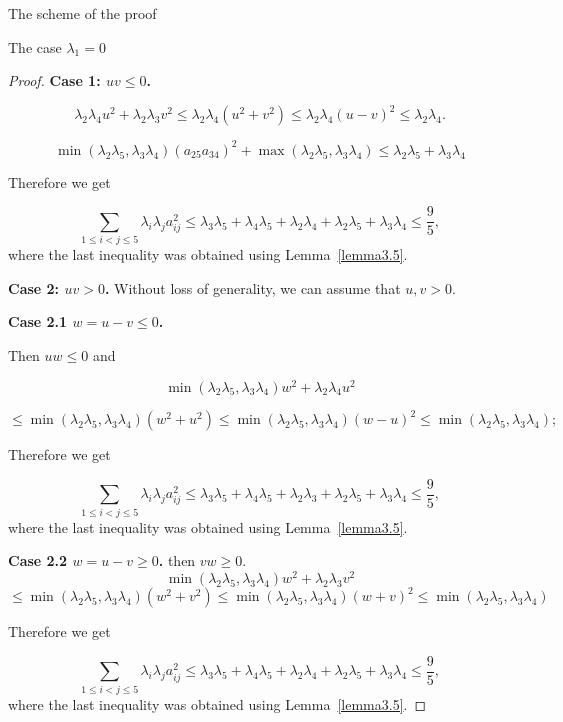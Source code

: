 \documentclass[12pt]{article}
\begin{document}
\begin{section}{The scheme of the proof}
\begin{section}{The case  \texorpdfstring{$\lambda_{1} = 0$}{Lg}}
\begin{proof}
    \textbf{Case 1: $uv\leq 0$.} 

    $$
        \lambda_{2}\lambda_{4}u^{2} + \lambda_{2}\lambda_{3}v^{2} \leq   \lambda_{2}\lambda_{4}(u^{2} + v^{2}) \leq \lambda_{2}\lambda_{4}(u - v)^{2} \leq \lambda_{2}\lambda_{4}.
    $$

    $$
     \min(\lambda_{2}\lambda_{5},\lambda_{3}\lambda_{4} )(a_{25}a_{34})^{2} + \max(\lambda_{2}\lambda_{5},\lambda_{3}\lambda_{4} ) \leq \lambda_{2}\lambda_{5} + \lambda_{3}\lambda_{4}
    $$

    Therefore we get
    
    $$
        \sum_{1\leq i < j\leq 5}\lambda_{i}\lambda_{j} a_{ij}^{2} \leq \lambda_{3}\lambda_{5} + \lambda_{4}\lambda_{5} + \lambda_{2}\lambda_{4} + \lambda_{2}\lambda_{5} + \lambda_{3}\lambda_{4}\leq \frac{9}{5},
    $$
    where the last inequality was obtained using Lemma~\ref{lemma3.5}. 
    
    \textbf{Case 2: $uv > 0$.}
    Without loss of generality, we can assume that 
    $u,v>0$.
    
    \textbf{Case 2.1 $w = u-v \leq 0$.}
    
    Then $ uw\leq 0$ and  

    $$
        \min(\lambda_{2}\lambda_{5},\lambda_{3}\lambda_{4} )w^{2} + \lambda_{2}\lambda_{4}u^{2}
        $$
        
        $$
        \leq \min(\lambda_{2}\lambda_{5},\lambda_{3}\lambda_{4} )(w^{2} + u^{2}) \leq \min(\lambda_{2}\lambda_{5},\lambda_{3}\lambda_{4} )(w - u)^{2} \leq \min(\lambda_{2}\lambda_{5},\lambda_{3}\lambda_{4} );
    $$

     Therefore we get
    
    $$
        \sum_{1\leq i < j\leq 5}\lambda_{i}\lambda_{j} a_{ij}^{2} \leq \lambda_{3}\lambda_{5} + \lambda_{4}\lambda_{5} + \lambda_{2}\lambda_{3} + \lambda_{2}\lambda_{5} + \lambda_{3}\lambda_{4}\leq \frac{9}{5},
    $$
    where the last inequality was obtained using Lemma~\ref{lemma3.5}.

    \textbf{Case  2.2 $w = u-v \geq 0$.} then $vw\geq 0.$
    $$
        \min(\lambda_{2}\lambda_{5},\lambda_{3}\lambda_{4} )w^{2} + \lambda_{2}\lambda_{3}v^{2}     
        $$
        $$\leq \min(\lambda_{2}\lambda_{5},\lambda_{3}\lambda_{4} )(w^{2} + v^{2}) \leq \min(\lambda_{2}\lambda_{5},\lambda_{3}\lambda_{4} )(w + v)^{2} \leq \min(\lambda_{2}\lambda_{5},\lambda_{3}\lambda_{4} )
    $$

     Therefore we get
    
    $$
        \sum_{1\leq i < j\leq 5}\lambda_{i}\lambda_{j} a_{ij}^{2} \leq \lambda_{3}\lambda_{5} + \lambda_{4}\lambda_{5} + \lambda_{2}\lambda_{4} + \lambda_{2}\lambda_{5} + \lambda_{3}\lambda_{4}\leq \frac{9}{5},
    $$
    where the last inequality was obtained using Lemma~\ref{lemma3.5}.

\end{proof}
    
\end{section}

\end{section}
\end{document}
